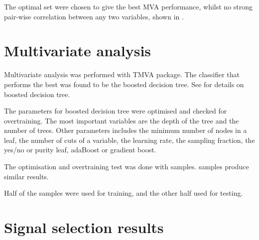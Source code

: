 The optimal set were chosen to give the best MVA performance, whilst no strong pair-wise correlation between any two variables, shown in \Figure{}.



\section{Multivariate analysis}

Multivariate analysis was performed with TMVA package. The classifier that performs the best was found to be the boosted decision tree. See \Section{} for details on boosted decision tree.

The parameters for boosted decision tree were optimised and checked for overtraining. The most important variables are the depth of the tree and the number of trees. Other parameters includes the minimum number of nodes in a leaf, the number of cuts of a variable, the learning rate, the sampling fraction, the yes/no or purity leaf, adaBoost or gradient boost.

The optimisation and overtraining test was done with  samples.  samples produce similar results.

Half of the samples were used for training, and the other half used for testing.


\section{Signal selection results}

